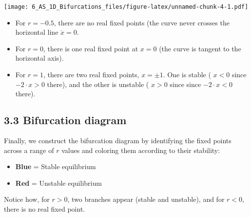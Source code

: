 \documentclass[
]{article}
\providecommand{\tightlist}{%
  \setlength{\itemsep}{0pt}\setlength{\parskip}{0pt}}
\begin{document}
\texttt{[image: 6\_AS\_1D\_Bifurcations\_files/figure-latex/unnamed-chunk-4-1.pdf]}

\begin{itemize}
\tightlist
\item
  For \(r =-0.5\), there are no real fixed points (the curve never
  crosses the horizontal line \(\dot{x} =0\).
\item
  For \(r =0\), there is one real fixed point at \(x =0\) (the curve is
  tangent to the horizontal axis).
\item
  For \(r = 1\), there are two real fixed points, \(x =\pm 1\). One is
  stable ( \(x<0\) since \(-2\cdot x >0\) there), and the other is
  unstable ( \(x>0\) since since \(-2\cdot x < 0\) there).
\end{itemize}

\subsection{\texorpdfstring{\textbf{3.3 Bifurcation
diagram}}{3.3 Bifurcation diagram}}\label{bifurcation-diagram-2}

Finally, we construct the bifurcation diagram by identifying the fixed
points across a range of \(r\) values and coloring them according to
their stability:

\begin{itemize}
\tightlist
\item
  \textbf{Blue} = Stable equilibrium
\item
  \textbf{Red} = Unstable equilibrium
\end{itemize}

Notice how, for \(r > 0\), two branches appear (stable and unstable),
and for \(r < 0\), there is no real fixed point.
\end{document}
